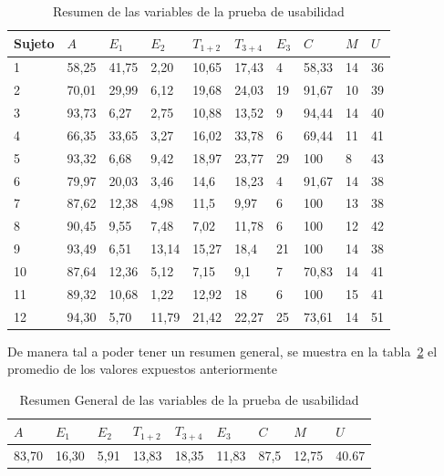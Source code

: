 \begin{table}[H]
\centering
\footnotesize
\begin{tabular}{|p{1.2cm}|p{1.2cm}|p{1.2cm}|p{1.2cm}|p{1.2cm}|p{1.2cm}|p{1.2cm}|p{1.2cm}|p{1.2cm}|p{1.2cm}|}
\hline
Sujeto  &   $A$  &   $E_1$ &  $E_2$  &  $T_{1+2}$  & $T_{3+4}$     & $E_3$ & $C$ &  $M$ & $U$ \\
\hline 
1 &  58,25 & 41,75 & 2,20  & 10,65 & 17,43 & 4  & 58,33 & 14 & 36 \\
2 &  70,01 & 29,99 & 6,12  & 19,68 & 24,03 & 19 & 91,67 & 10 & 39 \\
3 &  93,73 & 6,27  & 2,75  & 10,88 & 13,52 & 9  & 94,44 & 14 & 40 \\
4 &  66,35 & 33,65 & 3,27  & 16,02 & 33,78 & 6  & 69,44 & 11 & 41 \\
5 &  93,32 & 6,68  & 9,42  & 18,97 & 23,77 & 29 & 100     & 8  & 43 \\
6 &  79,97 & 20,03 & 3,46  & 14,6  & 18,23 & 4  & 91,67 & 14 & 38 \\
7 &  87,62 & 12,38 & 4,98  & 11,5  & 9,97  & 6  & 100     & 13 & 38 \\
8 &  90,45 & 9,55  & 7,48  & 7,02  & 11,78 & 6  & 100     & 12 & 42 \\
9 &  93,49 & 6,51  & 13,14 & 15,27 & 18,4  & 21 & 100     & 14 & 38 \\
10 & 87,64 & 12,36 & 5,12  & 7,15  & 9,1   & 7  & 70,83 & 14 & 41 \\
11 & 89,32 & 10,68 & 1,22  & 12,92 & 18      & 6  & 100     & 15 & 41 \\
12 & 94,30 & 5,70  & 11,79 & 21,42 & 22,27 & 25 & 73,61 & 14 & 51 \\
\hline
\end{tabular}
\caption{Resumen de las variables de la prueba de usabilidad}
\label{sec:tabla-resumen-prueba}
\end{table}

De manera tal a poder tener un resumen general, se muestra en la tabla~\ref{sec:tabla-resumen-promedio} el promedio
de los valores expuestos anteriormente

\begin{table}[H]
\centering
\footnotesize
\begin{tabular}{|p{1.2cm}|p{1.2cm}|p{1.2cm}|p{1.2cm}|p{1.2cm}|p{1.2cm}|p{1.2cm}|p{1.2cm}|p{1.2cm}|}
\hline
$A$  &   $E_1$ &  $E_2$  &  $T_{1+2}$  & $T_{3+4}$     & $E_3$ & $C$ &  $M$ & $U$ \\
\hline 
83,70 & 16,30 & 5,91 & 13,83  & 18,35  & 11,83 & 87,5  & 12,75  & 40.67 \\
\hline
\end{tabular}
\caption{Resumen General de las variables de la prueba de usabilidad}
\label{sec:tabla-resumen-promedio}
\end{table}


